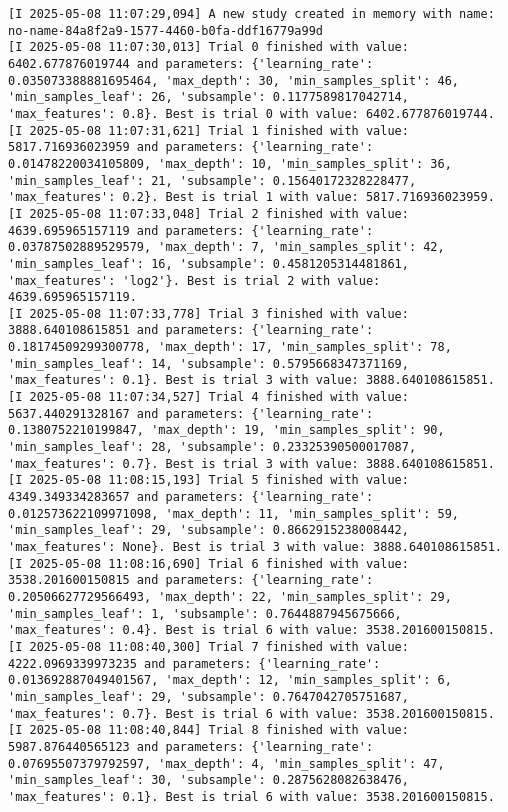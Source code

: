 \documentclass[
  letterpaper,
  DIV=11,
  numbers=noendperiod]{scrreprt}
\begin{document}
\begin{verbatim}
[I 2025-05-08 11:07:29,094] A new study created in memory with name: no-name-84a8f2a9-1577-4460-b0fa-ddf16779a99d
[I 2025-05-08 11:07:30,013] Trial 0 finished with value: 6402.677876019744 and parameters: {'learning_rate': 0.035073388881695464, 'max_depth': 30, 'min_samples_split': 46, 'min_samples_leaf': 26, 'subsample': 0.1177589817042714, 'max_features': 0.8}. Best is trial 0 with value: 6402.677876019744.
[I 2025-05-08 11:07:31,621] Trial 1 finished with value: 5817.716936023959 and parameters: {'learning_rate': 0.01478220034105809, 'max_depth': 10, 'min_samples_split': 36, 'min_samples_leaf': 21, 'subsample': 0.15640172328228477, 'max_features': 0.2}. Best is trial 1 with value: 5817.716936023959.
[I 2025-05-08 11:07:33,048] Trial 2 finished with value: 4639.695965157119 and parameters: {'learning_rate': 0.03787502889529579, 'max_depth': 7, 'min_samples_split': 42, 'min_samples_leaf': 16, 'subsample': 0.4581205314481861, 'max_features': 'log2'}. Best is trial 2 with value: 4639.695965157119.
[I 2025-05-08 11:07:33,778] Trial 3 finished with value: 3888.640108615851 and parameters: {'learning_rate': 0.18174509299300778, 'max_depth': 17, 'min_samples_split': 78, 'min_samples_leaf': 14, 'subsample': 0.5795668347371169, 'max_features': 0.1}. Best is trial 3 with value: 3888.640108615851.
[I 2025-05-08 11:07:34,527] Trial 4 finished with value: 5637.440291328167 and parameters: {'learning_rate': 0.1380752210199847, 'max_depth': 19, 'min_samples_split': 90, 'min_samples_leaf': 28, 'subsample': 0.23325390500017087, 'max_features': 0.7}. Best is trial 3 with value: 3888.640108615851.
[I 2025-05-08 11:08:15,193] Trial 5 finished with value: 4349.349334283657 and parameters: {'learning_rate': 0.012573622109971098, 'max_depth': 11, 'min_samples_split': 59, 'min_samples_leaf': 29, 'subsample': 0.8662915238008442, 'max_features': None}. Best is trial 3 with value: 3888.640108615851.
[I 2025-05-08 11:08:16,690] Trial 6 finished with value: 3538.201600150815 and parameters: {'learning_rate': 0.20506627729566493, 'max_depth': 22, 'min_samples_split': 29, 'min_samples_leaf': 1, 'subsample': 0.7644887945675666, 'max_features': 0.4}. Best is trial 6 with value: 3538.201600150815.
[I 2025-05-08 11:08:40,300] Trial 7 finished with value: 4222.0969339973235 and parameters: {'learning_rate': 0.013692887049401567, 'max_depth': 12, 'min_samples_split': 6, 'min_samples_leaf': 29, 'subsample': 0.7647042705751687, 'max_features': 0.7}. Best is trial 6 with value: 3538.201600150815.
[I 2025-05-08 11:08:40,844] Trial 8 finished with value: 5987.876440565123 and parameters: {'learning_rate': 0.07695507379792597, 'max_depth': 4, 'min_samples_split': 47, 'min_samples_leaf': 30, 'subsample': 0.2875628082638476, 'max_features': 0.1}. Best is trial 6 with value: 3538.201600150815.

\end{verbatim}
\end{document}
